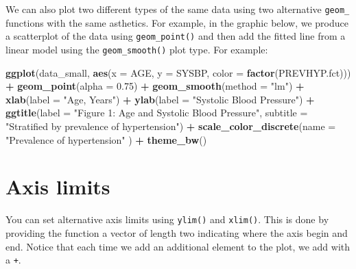 \documentclass[
]{article}
\newenvironment{Shaded}{\begin{snugshade}}{\end{snugshade}}
\newcommand{\DataTypeTok}[1]{\textcolor[rgb]{0.13,0.29,0.53}{#1}}
\newcommand{\FloatTok}[1]{\textcolor[rgb]{0.00,0.00,0.81}{#1}}
\newcommand{\KeywordTok}[1]{\textcolor[rgb]{0.13,0.29,0.53}{\textbf{#1}}}
\newcommand{\NormalTok}[1]{#1}
\newcommand{\OperatorTok}[1]{\textcolor[rgb]{0.81,0.36,0.00}{\textbf{#1}}}
\newcommand{\StringTok}[1]{\textcolor[rgb]{0.31,0.60,0.02}{#1}}
\begin{document}
We can also plot two different types of the same data using two
alternative \texttt{geom\_} functions with the same asthetics. For
example, in the graphic below, we produce a scatterplot of the data
using \texttt{geom\_point()} and then add the fitted line from a linear
model using the \texttt{geom\_smooth()} plot type. For example:

\begin{Shaded}
\begin{Highlighting}[]
\KeywordTok{ggplot}\NormalTok{(data_small, }
      \KeywordTok{aes}\NormalTok{(}\DataTypeTok{x =}\NormalTok{ AGE, }\DataTypeTok{y =}\NormalTok{ SYSBP, }\DataTypeTok{color =} \KeywordTok{factor}\NormalTok{(PREVHYP.fct))) }\OperatorTok{+}
\StringTok{  }\KeywordTok{geom_point}\NormalTok{(}\DataTypeTok{alpha =} \FloatTok{0.75}\NormalTok{) }\OperatorTok{+}
\StringTok{  }\KeywordTok{geom_smooth}\NormalTok{(}\DataTypeTok{method =} \StringTok{"lm"}\NormalTok{) }\OperatorTok{+}
\StringTok{  }\KeywordTok{xlab}\NormalTok{(}\DataTypeTok{label =} \StringTok{"Age, Years"}\NormalTok{) }\OperatorTok{+}\StringTok{ }
\StringTok{  }\KeywordTok{ylab}\NormalTok{(}\DataTypeTok{label =} \StringTok{"Systolic Blood Pressure"}\NormalTok{) }\OperatorTok{+}
\StringTok{  }\KeywordTok{ggtitle}\NormalTok{(}\DataTypeTok{label =} \StringTok{"Figure 1: Age and Systolic Blood Pressure"}\NormalTok{, }
          \DataTypeTok{subtitle =} \StringTok{"Stratified by prevalence of hypertension"}\NormalTok{) }\OperatorTok{+}\StringTok{ }
\StringTok{  }\KeywordTok{scale_color_discrete}\NormalTok{(}\DataTypeTok{name =} \StringTok{"Prevalence of hypertension"}\NormalTok{ ) }\OperatorTok{+}\StringTok{ }
\StringTok{  }\KeywordTok{theme_bw}\NormalTok{()}
\end{Highlighting}
\end{Shaded}

\hypertarget{axis-limits}{%
\section{Axis limits}\label{axis-limits}}

You can set alternative axis limits using \texttt{ylim()} and
\texttt{xlim()}. This is done by providing the function a vector of
length two indicating where the axis begin and end. Notice that each
time we add an additional element to the plot, we add with a \texttt{+}.
\end{document}
